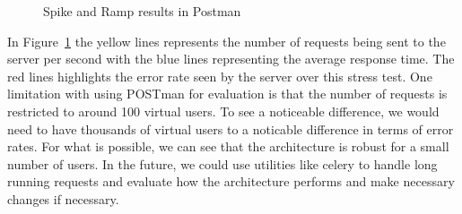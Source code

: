 \documentclass{surreydissertation}
\begin{document}
\begin{figure}
    \centering
    \caption{Spike and Ramp results in Postman}
    \label{fig:results}
    \end{figure}

In Figure~\ref{fig:results} the yellow lines represents the number of requests being sent to the server per second with the blue lines representing the average response time. The red lines highlights the error rate seen by the server over this stress test. One limitation with using POSTman for evaluation is that the number of requests is restricted to around 100 virtual users. To see a noticeable difference, we would need to have thousands of virtual users to a noticable difference in terms of error rates. For what is possible, we can see that the architecture is robust for a small number of users. In the future, we could use utilities like celery to handle long running requests and evaluate how the architecture performs and make necessary changes if necessary.
\end{document}
